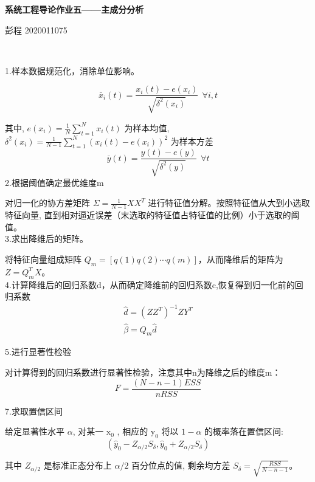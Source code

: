 \documentclass[UTF8]{ctexart}
\begin{document}
\begin{center}
  \textbf{\LARGE{系统工程导论作业五——主成分分析}}\\
\end{center}
\begin{center}
  \large{彭程 2020011075}
\end{center}


\noindent \textbf{}\\

\noindent \textbf{}

\noindent 1.样本数据规范化，消除单位影响。

$$
\bar{x}_{i}(t)=\frac{x_{i}(t)-e\left(x_{i}\right)}{\sqrt{\delta^{2}\left(x_{i}\right)}} ~~\forall i, t
$$

其中,  $e\left(x_{i}\right)=\frac{1}{N} \sum_{t=1}^{N} x_{i}(t)$  为样本均值, $ \delta^{2}\left(x_{i}\right)=\frac{1}{N-1} \sum_{t=1}^{N} \left(x_{i}(t)-e\left(x_{i}\right)\right)^{2} $ 为样本方差
$$
\bar{y}(t)=\frac{y(t)-e(y)}{\sqrt{\delta^{2}(y)}} ~~\forall t
$$
\noindent 2.根据阈值确定最优维度m

对归一化的协方差矩阵  $\Sigma =  \frac{1}{N-1} X X^{T}$  进行特征值分解。按照特征值从大到小选取特征向量, 直到相对逼近误差（末选取的特征值占特征值的比例）小于选取的阈值。\\

\noindent 3.求出降维后的矩阵。

将特征向量组成矩阵 $ Q_{m}=[q(1) q(2) \cdots q(m)] $，从而降维后的矩阵为$Z=Q_{m}^T X $。\\

\noindent 4.计算降维后的回归系数d，从而确定降维前的回归系数c,恢复得到归一化前的回归系数
$$
\begin{array}{c}
\hat{d}=\left(Z Z^{T}\right)^{-1} Z Y^{T} \\
\hat{\beta}=Q_{m} \hat{d}
\end{array}
$$

\noindent 5.进行显著性检验

对计算得到的回归系数进行显著性检验，注意其中n为降维之后的维度m：
$$
F=\frac{(N-n-1) E S S}{n R S S}
$$

\noindent 7.求取置信区间


给定显著性水平 $ \alpha $, 对某一  $\mathrm{x}_{0}$ , 相应的  $\mathrm{y}_{0} $ 将以 $ 1-\alpha$  的概率落在置信区间:
$$
\left(\hat{y}_{0}-Z_{\alpha / 2} S_{\delta}, \hat{y}_{0}+Z_{\alpha / 2} S_{\delta}\right)
$$

其中 $ Z_{\alpha / 2} $ 是标准正态分布上  $\alpha / 2 $ 百分位点的值, 剩余均方差  $S_{\delta}=\sqrt{\frac{R S S}{N-n-1}}$。\\
\end{document}
